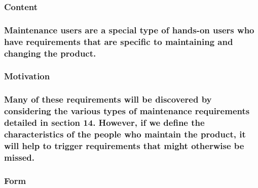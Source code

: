 \documentclass[
]{article}
\begin{document}
\hypertarget{content-9}{%
\subsubsection{Content}\label{content-9}}

\hypertarget{maintenance-users-are-a-special-type-of-hands-on-users-who-have-requirements-that-are-specific-to-maintaining-and-changing-the-product.}{%
\subsubsection{\texorpdfstring{Maintenance users are a special type of
hands-on users who have requirements that are specific to maintaining
and changing the product.
}{Maintenance users are a special type of hands-on users who have requirements that are specific to maintaining and changing the product. }}\label{maintenance-users-are-a-special-type-of-hands-on-users-who-have-requirements-that-are-specific-to-maintaining-and-changing-the-product.}}

\hypertarget{motivation-9}{%
\subsubsection{Motivation}\label{motivation-9}}

\hypertarget{many-of-these-requirements-will-be-discovered-by-considering-the-various-types-of-maintenance-requirements-detailed-in-section-14.-however-if-we-define-the-characteristics-of-the-people-who-maintain-the-product-it-will-help-to-trigger-requirements-that-might-otherwise-be-missed.}{%
\subsubsection{Many of these requirements will be discovered by
considering the various types of maintenance requirements detailed in
section 14. However, if we define the characteristics of the people who
maintain the product, it will help to trigger requirements that might
otherwise be
missed.}\label{many-of-these-requirements-will-be-discovered-by-considering-the-various-types-of-maintenance-requirements-detailed-in-section-14.-however-if-we-define-the-characteristics-of-the-people-who-maintain-the-product-it-will-help-to-trigger-requirements-that-might-otherwise-be-missed.}}

\hypertarget{form-9}{%
\subsubsection{Form}\label{form-9}}
\end{document}
